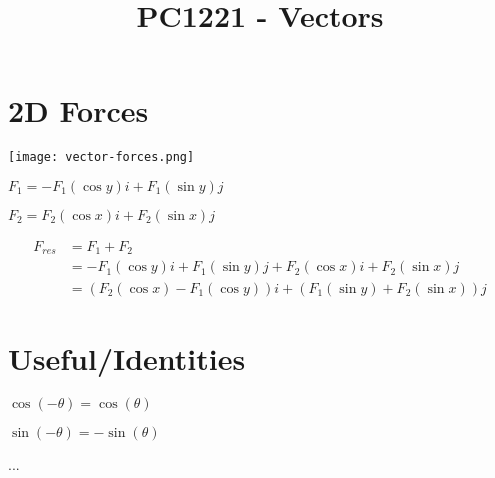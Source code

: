 \documentclass[12pt]{article}
\title{\textbf{PC1221 - Vectors}}
\date{}
\begin{document}
\maketitle

\begin{spacing}{1.5}

\section{2D Forces}

\texttt{[image: vector-forces.png]}

$F_{1} = - F_1(\cos{y})i + F_1(\sin{y})j$

$F_{2} = F_2(\cos{x})i + F_2(\sin{x})j$

$$\begin{aligned}
F_{res} &=  F_1 + F_2 \\
&= - F_1(\cos{y})i + F_1(\sin{y})j + F_2(\cos{x})i + F_2(\sin{x})j \\
&= (F_2(\cos{x}) - F_1(\cos{y}))i + (F_1(\sin{y}) + F_2(\sin{x}))j
\end{aligned}$$

\section{Useful/Identities}

$\cos{(-\theta)} = \cos{(\theta)}$

$\sin{(-\theta)} = -\sin{(\theta)}$

...

\end{spacing}
\end{document}
